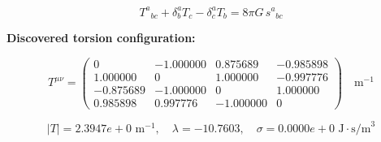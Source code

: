 
\begin{equation}
  T^a{}_{bc} + \delta^a_b T_c - \delta^a_c T_b = 8\pi G \, s^a{}_{bc}
\end{equation}

\textbf{Discovered torsion configuration:}

\begin{equation}
  T^{\mu\nu} = \begin{pmatrix}
    0 & -1.000000 & 0.875689 & -0.985898 \\
    1.000000 & 0 & 1.000000 & -0.997776 \\
    -0.875689 & -1.000000 & 0 & 1.000000 \\
    0.985898 & 0.997776 & -1.000000 & 0
  \end{pmatrix} \quad \text{m}^{-1}
\end{equation}

\begin{equation}
  |T| = 2.3947e+0 \text{ m}^{-1}, \quad
  \lambda = -10.7603, \quad
  \sigma = 0.0000e+0 \text{ J}\cdot\text{s/m}^3
\end{equation}